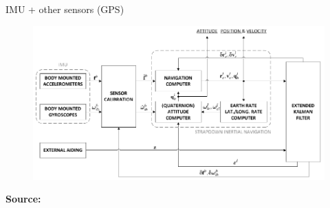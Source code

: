 \documentclass[envcountsect,usenames,dvipsnames]{beamer}
\theoremstyle{mystyle}
\begin{document}
\begin{frame}{IMU + other sensors (GPS)}	 
\begin{figure}
	\centering
	\includegraphics[width = 12cm]{Images/Int_INS}
\end{figure}
\vspace{0.15cm}
\scriptsize{\textbf{{\color{beamer@UIUCblue}Source:}} \cite{stebler2012PHD}}
\end{frame}
\end{document}
